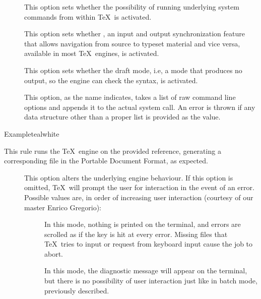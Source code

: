 \begin{description}
\begin{description}
\item[] This option sets whether the possibility of running underlying system commands from within \TeX\ is activated.

\item[] This option sets whether , an input and output synchronization feature that allows navigation from source to typeset material and vice versa, available in most \TeX\ engines, is activated.

\item[] This option sets whether the draft mode, i.e, a mode that produces no output, so the engine can check the syntax, is activated.

\item[] This option, as the name indicates, takes a list of raw command line options and appends it to the actual system call. An error is thrown if any data structure other than a proper list is provided as the value.
\end{description}

\begin{codebox}{Example}{teal}{\icnote}{white}
\end{codebox}

\item[\rulebox{luatex}]
This rule runs the  \TeX\ engine on the provided  reference, generating a corresponding file in the Portable Document Format, as expected.

\begin{description}
\item[] This option alters the underlying engine behaviour. If this option is omitted, \TeX\ will prompt the user for interaction in the event of an error. Possible values are, in order of increasing user interaction (courtesy of our master Enrico Gregorio):

\begin{description}
\item[] In this mode, nothing is printed on the terminal, and errors are scrolled as if the  key is hit at every error. Missing files that \TeX\ tries to input or request from keyboard input cause the job to abort.

\item[] In this mode, the diagnostic message will appear on the terminal, but there is no possibility of user interaction just like in batch mode, previously described.


\end{description}
\end{description}
\end{description}
